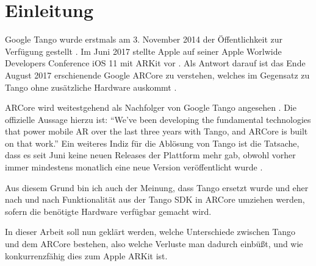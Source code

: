 
\section{Einleitung}

Google Tango wurde erstmals am 3. November 2014 der Öffentlichkeit zur Verfügung gestellt \cite{tango_release_notes}. Im Juni 2017 stellte Apple auf seiner Apple Worlwide Developers Conference iOS 11 mit ARKit vor \cite{ios11_announcement}. Als Antwort darauf ist das Ende August 2017 erschienende Google ARCore zu verstehen, welches im Gegensatz zu Tango ohne zusätzliche Hardware auskommt \cite{arcore_announcement}.\par
ARCore wird weitestgehend als Nachfolger von Google Tango angesehen \cite{cnet_arcore}\cite{heise_arcore}. Die offizielle Aussage hierzu ist: "`We’ve been developing the fundamental technologies that power mobile AR over the last three years with Tango, and ARCore is built on that work."' Ein weiteres Indiz für die Ablösung von Tango ist die Tatsache, dass es seit Juni keine neuen Releases der Plattform mehr gab, obwohl vorher immer mindestens monatlich eine neue Version veröffentlicht wurde \cite{tango_release_notes}. \par
Aus diesem Grund bin ich auch der Meinung, dass Tango ersetzt wurde und eher nach und nach Funktionalität aus der Tango SDK in ARCore umziehen werden, sofern die benötigte Hardware verfügbar gemacht wird.\par
In dieser Arbeit soll nun geklärt werden, welche Unterschiede zwischen Tango und dem ARCore bestehen, also welche Verluste man dadurch einbüßt, und wie konkurrenzfähig dies zum Apple ARKit ist.